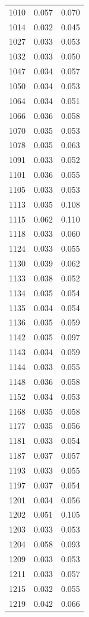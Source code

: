 \begin{tabular}{rrr}
1010 & 0.057 & 0.070 \\
1014 & 0.032 & 0.045 \\
1027 & 0.033 & 0.053 \\
1032 & 0.033 & 0.050 \\
1047 & 0.034 & 0.057 \\
1050 & 0.034 & 0.053 \\
1064 & 0.034 & 0.051 \\
1066 & 0.036 & 0.058 \\
1070 & 0.035 & 0.053 \\
1078 & 0.035 & 0.063 \\
1091 & 0.033 & 0.052 \\
1101 & 0.036 & 0.055 \\
1105 & 0.033 & 0.053 \\
1113 & 0.035 & 0.108 \\
1115 & 0.062 & 0.110 \\
1118 & 0.033 & 0.060 \\
1124 & 0.033 & 0.055 \\
1130 & 0.039 & 0.062 \\
1133 & 0.038 & 0.052 \\
1134 & 0.035 & 0.054 \\
1135 & 0.034 & 0.054 \\
1136 & 0.035 & 0.059 \\
1142 & 0.035 & 0.097 \\
1143 & 0.034 & 0.059 \\
1144 & 0.033 & 0.055 \\
1148 & 0.036 & 0.058 \\
1152 & 0.034 & 0.053 \\
1168 & 0.035 & 0.058 \\
1177 & 0.035 & 0.056 \\
1181 & 0.033 & 0.054 \\
1187 & 0.037 & 0.057 \\
1193 & 0.033 & 0.055 \\
1197 & 0.037 & 0.054 \\
1201 & 0.034 & 0.056 \\
1202 & 0.051 & 0.105 \\
1203 & 0.033 & 0.053 \\
1204 & 0.058 & 0.093 \\
1209 & 0.033 & 0.053 \\
1211 & 0.033 & 0.057 \\
1215 & 0.032 & 0.055 \\
1219 & 0.042 & 0.066 \\

\end{tabular}
